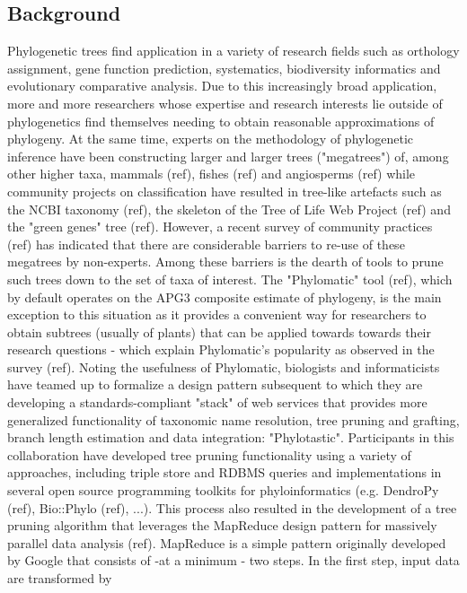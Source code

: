 \documentclass[10pt]{bmc_article}
\newenvironment{bmcformat}{\begin{raggedright}\baselineskip20pt\sloppy\setboolean{publ}{false}}{\end{raggedright}\baselineskip20pt\sloppy}
\begin{document}
\begin{bmcformat}
\section*{Background}
Phylogenetic trees find application in a variety of research fields such as
orthology assignment, gene function prediction, systematics, biodiversity 
informatics and evolutionary comparative analysis. Due to this increasingly 
broad application, more and more researchers whose expertise and research 
interests lie outside of phylogenetics find themselves needing to obtain 
reasonable approximations of phylogeny. At the same time, experts on the 
methodology of phylogenetic inference have been constructing larger and 
larger trees ("megatrees") of, among other higher taxa, mammals (ref), 
fishes (ref) and angiosperms (ref) while community projects on classification 
have resulted in tree-like artefacts such as the NCBI taxonomy (ref), the 
skeleton of the Tree of Life Web Project (ref) and the "green genes" tree (ref). However, a recent survey of community practices (ref) has indicated that there are considerable barriers to re-use of these megatrees by non-experts. Among these barriers is the dearth of tools to prune such trees down to the set of taxa of interest. The "Phylomatic" tool (ref), which by default operates on the APG3 composite estimate of phylogeny, is the main exception to this situation as it provides a convenient way for researchers to obtain subtrees (usually of plants) that can be applied towards towards their research questions - which explain Phylomatic's popularity as observed in the survey (ref). Noting the usefulness of Phylomatic, biologists and informaticists have teamed up to formalize a design pattern subsequent to which they are developing a standards-compliant "stack" of web services that provides more generalized functionality of taxonomic name resolution, tree pruning and grafting, branch length estimation and data integration:
"Phylotastic". Participants in this collaboration have developed tree pruning functionality using a variety of approaches, including triple store and RDBMS queries and implementations in several open source programming toolkits for phyloinformatics (e.g. DendroPy (ref), Bio::Phylo (ref), ...). This process also resulted in the development of a tree pruning algorithm that leverages the MapReduce design pattern for massively parallel data analysis (ref). MapReduce is a simple pattern originally developed by Google that consists of -at a minimum - two steps. In the first step, input data are transformed by 

\end{bmcformat}
\end{document}
